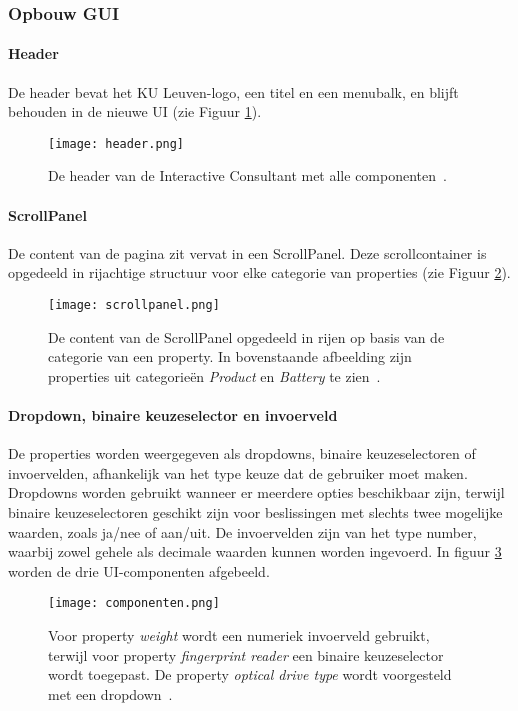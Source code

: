 \subsubsection{Opbouw GUI}
\paragraph{Header}
De header bevat het KU Leuven-logo, een titel en een menubalk, en blijft behouden in de nieuwe UI (zie Figuur \ref{fig:header}).

\begin{figure}
  \centering
  \texttt{[image: header.png]}
  \caption[Header huidige en nieuwe UI.]{\label{fig:header}De header van de Interactive Consultant met alle componenten~\autocite{KULeuven}.}
\end{figure}

\paragraph{ScrollPanel}
De content van de pagina zit vervat in een ScrollPanel. Deze scrollcontainer is opgedeeld in rijachtige structuur voor elke categorie van properties (zie Figuur \ref{fig:scrollpanel}).

\begin{figure}
    \centering
    \texttt{[image: scrollpanel.png]}
    \caption[ScrollPanel van huidige UI]{\label{fig:scrollpanel}De content van de ScrollPanel opgedeeld in rijen op basis van de categorie van een property. In bovenstaande afbeelding zijn properties uit categorieën \textit{Product} en \textit{Battery} te zien~\autocite{KULeuven}.}
\end{figure}

\paragraph{Dropdown, binaire keuzeselector en invoerveld}
De properties worden weergegeven als dropdowns, binaire keuzeselectoren of invoervelden, afhankelijk van het type keuze dat de gebruiker moet maken. Dropdowns worden gebruikt wanneer er meerdere opties beschikbaar zijn, terwijl binaire keuzeselectoren geschikt zijn voor beslissingen met slechts twee mogelijke waarden, zoals ja/nee of aan/uit. De invoervelden zijn van het type number, waarbij zowel gehele als decimale waarden kunnen worden ingevoerd. In figuur \ref{fig:componenten} worden de drie UI-componenten afgebeeld.

\begin{figure}
    \centering
    \texttt{[image: componenten.png]}
    \caption[Dropdown, binaire keuzeselector en invoerveld]{\label{fig:componenten}Voor property \textit{weight} wordt  een numeriek invoerveld gebruikt, terwijl voor property \textit{fingerprint reader} een binaire keuzeselector wordt toegepast. De property \textit{optical drive type} wordt voorgesteld met een dropdown~\autocite{KULeuven}.}
\end{figure}

